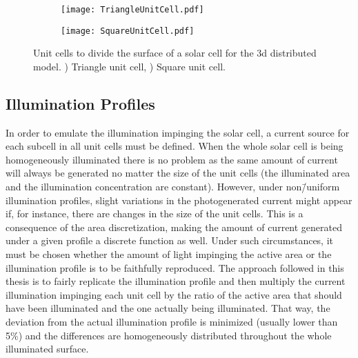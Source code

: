 \begin{figure}[h]
	\centering
	\begin{subfigure}[t]{0.45\textwidth}
        \centering       
        \texttt{[image: TriangleUnitCell.pdf]}
        \caption{}
        \label{fig:AppA_TriangleUnitCell}	
    \end{subfigure}
	\begin{subfigure}[t]{0.45\textwidth}
        \centering   
        \texttt{[image: SquareUnitCell.pdf]}    
        \caption{}
        \label{fig:AppA_SquareUnitCell}
    \end{subfigure}
	\caption[Unit cells to divide the surface of a solar cell for the \gls{3d} distributed model.]{Unit cells to divide the surface of a solar cell for the \gls{3d} distributed model. ) Triangle unit cell, ) Square unit cell.}
    \label{fig:AppA_UnitCells} 
\end{figure}

\subsection{Illumination Profiles}
In order to emulate the illumination impinging the solar cell, a current source for each subcell in all unit cells must be defined. When the whole solar cell is being homogeneously illuminated there is no problem as the same amount of current will always be generated no matter the size of the unit cells (the illuminated area and the illumination concentration are constant). However, under non\=/uniform illumination profiles, slight variations in the photogenerated current might appear if, for instance, there are changes in the size of the unit cells. This is a consequence of the area discretization, making the amount of current generated under a given profile a discrete function as well. Under such circumstances, it must be chosen whether the amount of light impinging the active area or the illumination profile is to be faithfully reproduced. The approach followed in this thesis is to fairly replicate the illumination profile and then multiply the current illumination impinging each unit cell by the ratio of the active area that should have been illuminated and the one actually being illuminated. That way, the deviation from the actual illumination profile is minimized (usually lower than 5\%) and the differences are homogeneously distributed throughout the whole illuminated surface. 

